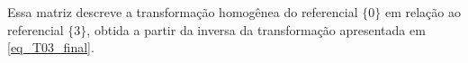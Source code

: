 



Essa matriz descreve a transformação homogênea do referencial $\{0\}$ em relação ao referencial $\{3\}$, obtida a partir da inversa da transformação apresentada em \eqref{eq_T03_final}.